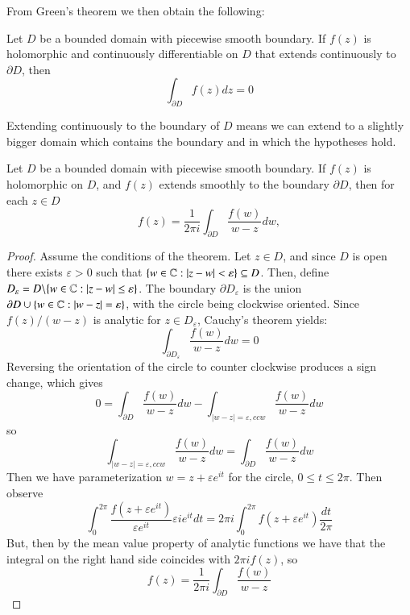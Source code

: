 From Green's theorem we then obtain the following:

\begin{theorem}
    Let $D$ be a bounded domain with piecewise smooth boundary. If $f(z)$ is holomorphic and continuously differentiable on $D$ that extends continuously to $\partial D$, then \begin{equation*}
        \int_{\partial D}f(z)dz = 0
    \end{equation*}
\end{theorem}

Extending continuously to the boundary of $D$ means we can extend to a slightly bigger domain which contains the boundary and in which the hypotheses hold.


\begin{theorem}
    Let $D$ be a bounded domain with piecewise smooth boundary. If $f(z)$ is holomorphic on $D$, and $f(z)$ extends smoothly to the boundary $\partial D$, then for each $z \in D$ \begin{equation*}
        f(z) = \frac{1}{2\pi i}\int_{\partial D}\frac{f(w)}{w-z}dw,
    \end{equation*}
\end{theorem}
\begin{proof}
    Assume the conditions of the theorem. Let $z \in D$, and since $D$ is open there exists $\varepsilon > 0$ such that $\{w \in \mathbb C: |z-w| < \varepsilon\} \subseteq D$. Then, define $D_{\varepsilon} = D\backslash \{w \in \mathbb C:|z-w| \leq \varepsilon\}$. The boundary $\partial D_{\varepsilon}$ is the union $\partial D\cup\{w \in \mathbb C:|w-z|=\varepsilon\}$, with the circle being clockwise oriented. Since $f(z)/(w-z)$ is analytic for $z \in D_{\varepsilon}$, Cauchy's theorem yields: \begin{equation*}
        \int_{\partial D_{\varepsilon}}\frac{f(w)}{w-z}dw = 0
    \end{equation*}
    Reversing the orientation of the circle to counter clockwise produces a sign change, which gives \begin{equation*}
        0 = \int_{\partial D}\frac{f(w)}{w-z}dw - \int_{|w-z| = \varepsilon, ccw}\frac{f(w)}{w-z}dw
    \end{equation*}
    so \begin{equation*}
        \int_{|w-z|=\varepsilon,ccw} \frac{f(w)}{w-z}dw = \int_{\partial D}\frac{f(w)}{w-z}dw
    \end{equation*}
    Then we have parameterization $w = z+\varepsilon e^{it}$ for the circle, $0 \leq t \leq 2\pi$. Then observe \begin{equation*}
        \int_{0}^{2\pi}\frac{f(z+\varepsilon e^{it})}{\varepsilon e^{it}}\varepsilon ie^{it}dt = 2\pi i\int_0^{2\pi}f(z+\varepsilon e^{it})\frac{dt}{2\pi}
    \end{equation*}
    But, then by the mean value property of analytic functions we have that the integral on the right hand side coincides with $2\pi if(z)$, so \begin{equation*}
        f(z) = \frac{1}{2\pi i}\int_{\partial D}\frac{f(w)}{w-z}
    \end{equation*}
\end{proof}

